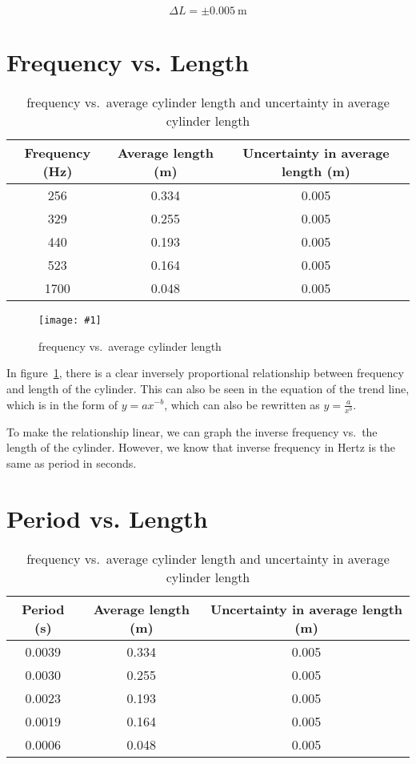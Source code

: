 \documentclass{article}
\newcommand{\graph}[2]{
  \begin{figure}[H]
    \medskip
    \centering
    \texttt{[image: \#1]}
    \caption{#2}
    \medskip\label{fig:#1}
  \end{figure}
}
\begin{document}
\[\Delta L=\pm\SI{0.005}{\metre}\]

\section{Frequency vs. Length}\label{sec:freq-vs-length}

\begin{table}[H]
  \centering
  \begin{tabular}{@{}ccc@{}}
    \toprule
    Frequency (Hz) & Average length (m) & Uncertainty in average
    length (m) \\
    \midrule
    256 & 0.334 & 0.005 \\
    329 & 0.255 & 0.005 \\
    440 & 0.193 & 0.005 \\
    523 & 0.164 & 0.005 \\
    1700 & 0.048 & 0.005 \\
    \bottomrule
  \end{tabular}
  \caption{frequency vs.\ average cylinder length and uncertainty in
  average cylinder length}\label{tab:freq-vs-length}
\end{table}

\graph{freq-vs-length}{frequency vs.\ average cylinder length}

In figure~\ref{fig:freq-vs-length}, there is a clear inversely proportional
relationship between frequency and length of the cylinder. This can
also be seen in the equation of the trend line, which is in the form
of \(y=ax^{-b}\), which can also be rewritten as \(y=\frac{a}{x^b}\).

To make the relationship linear, we can graph the inverse frequency
vs.\ the length of the cylinder. However, we know that inverse
frequency in Hertz is the same as period in seconds.

\section{Period vs. Length}

\begin{table}[H]
  \centering
  \begin{tabular}{@{}ccc@{}}
    \toprule
    Period (s) & Average length (m) & Uncertainty in average length (m) \\
    \midrule
    0.0039 & 0.334 & 0.005 \\
    0.0030 & 0.255 & 0.005 \\
    0.0023 & 0.193 & 0.005 \\
    0.0019 & 0.164 & 0.005 \\
    0.0006 & 0.048 & 0.005 \\
    \bottomrule
  \end{tabular}
  \caption{frequency vs.\ average cylinder length and uncertainty in
  average cylinder length}\label{tab:period-vs-length}
\end{table}
\end{document}
